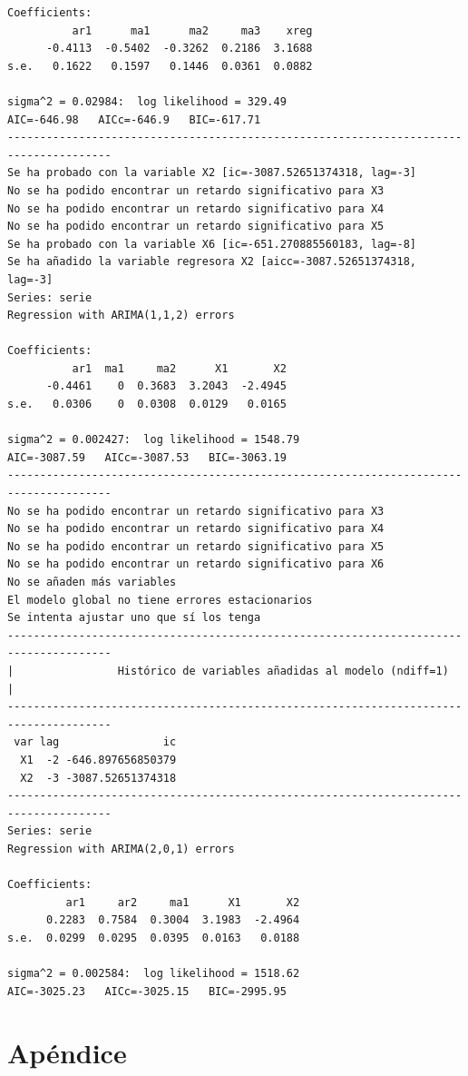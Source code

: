 \documentclass[
  12pt,
  a4paper]{article}
\begin{document}
\begin{verbatim}
Coefficients:
          ar1      ma1      ma2     ma3    xreg
      -0.4113  -0.5402  -0.3262  0.2186  3.1688
s.e.   0.1622   0.1597   0.1446  0.0361  0.0882

sigma^2 = 0.02984:  log likelihood = 329.49
AIC=-646.98   AICc=-646.9   BIC=-617.71
--------------------------------------------------------------------------------------
Se ha probado con la variable X2 [ic=-3087.52651374318, lag=-3]
No se ha podido encontrar un retardo significativo para X3
No se ha podido encontrar un retardo significativo para X4
No se ha podido encontrar un retardo significativo para X5
Se ha probado con la variable X6 [ic=-651.270885560183, lag=-8]
Se ha añadido la variable regresora X2 [aicc=-3087.52651374318, lag=-3]
Series: serie 
Regression with ARIMA(1,1,2) errors 

Coefficients:
          ar1  ma1     ma2      X1       X2
      -0.4461    0  0.3683  3.2043  -2.4945
s.e.   0.0306    0  0.0308  0.0129   0.0165

sigma^2 = 0.002427:  log likelihood = 1548.79
AIC=-3087.59   AICc=-3087.53   BIC=-3063.19
--------------------------------------------------------------------------------------
No se ha podido encontrar un retardo significativo para X3
No se ha podido encontrar un retardo significativo para X4
No se ha podido encontrar un retardo significativo para X5
No se ha podido encontrar un retardo significativo para X6
No se añaden más variables
El modelo global no tiene errores estacionarios
Se intenta ajustar uno que sí los tenga
--------------------------------------------------------------------------------------
|                Histórico de variables añadidas al modelo (ndiff=1)                 |
--------------------------------------------------------------------------------------
 var lag                ic
  X1  -2 -646.897656850379
  X2  -3 -3087.52651374318
--------------------------------------------------------------------------------------
Series: serie 
Regression with ARIMA(2,0,1) errors 

Coefficients:
         ar1     ar2     ma1      X1       X2
      0.2283  0.7584  0.3004  3.1983  -2.4964
s.e.  0.0299  0.0295  0.0395  0.0163   0.0188

sigma^2 = 0.002584:  log likelihood = 1518.62
AIC=-3025.23   AICc=-3025.15   BIC=-2995.95
\end{verbatim}

\newpage

\hypertarget{apendice}{%
\section{Apéndice}\label{apendice}}
\end{document}
